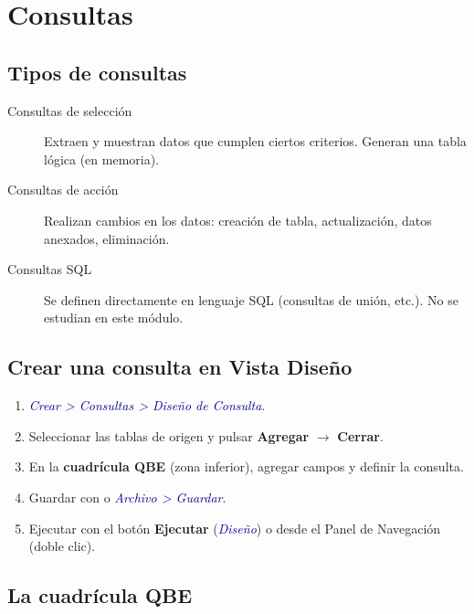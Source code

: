 \documentclass[12pt,a4paper]{article}
\newcommand{\tecla}[1]{\fbox{\small\texttt{#1}}}
\newcommand{\menu}[1]{\textit{\textcolor{darkblue}{#1}}}
\begin{document}
\section{Consultas}

\subsection{Tipos de consultas}

\begin{description}
  \item[Consultas de selección] Extraen y muestran datos que cumplen ciertos criterios. Generan una tabla lógica (en memoria).
  \item[Consultas de acción] Realizan cambios en los datos: creación de tabla, actualización, datos anexados, eliminación.
  \item[Consultas SQL] Se definen directamente en lenguaje SQL (consultas de unión, etc.). No se estudian en este módulo.
\end{description}

\subsection{Crear una consulta en Vista Diseño}

\begin{enumerate}
  \item \menu{Crear > Consultas > Diseño de Consulta}.
  \item Seleccionar las tablas de origen y pulsar \textbf{Agregar} $\rightarrow$ \textbf{Cerrar}.
  \item En la \textbf{cuadrícula QBE} (zona inferior), agregar campos y definir la consulta.
  \item Guardar con \tecla{Ctrl+G} o \menu{Archivo > Guardar}.
  \item Ejecutar con el botón \textbf{Ejecutar} (\menu{Diseño}) o desde el Panel de Navegación (doble clic).
\end{enumerate}

\subsection{La cuadrícula QBE}
\end{document}
